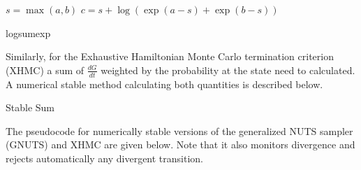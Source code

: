\documentclass[12pt]{report}
\begin{document}
\begin{algorithm}
\DontPrintSemicolon
{}
$s = \max(a,b) $\;
$c = s + \log( \exp(a-s) + \exp(b-s)) $\;

\caption{logsumexp}
\end{algorithm}

Similarly, for the Exhaustive Hamiltonian Monte Carlo termination criterion (XHMC) a sum of $\frac{dG}{dt}$ weighted by the probability at the state need to calculated. A numerical stable method calculating both quantities is described below.

\begin{algorithm}
\DontPrintSemicolon
{}

\caption{Stable Sum }
\end{algorithm}

The pseudocode for numerically stable versions of the generalized NUTS sampler (GNUTS) and XHMC are given below. Note that it also monitors divergence and rejects automatically any divergent transition.
\end{document}
